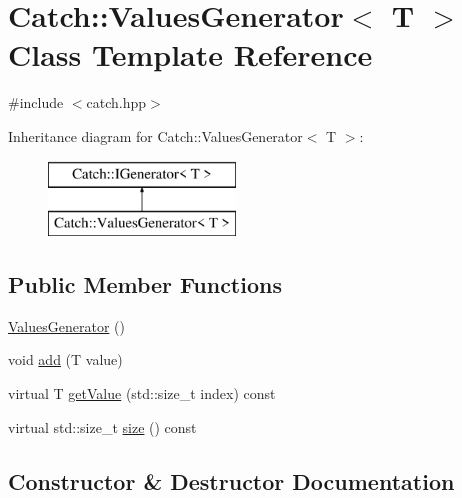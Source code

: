 \hypertarget{class_catch_1_1_values_generator}{}\section{Catch\+:\+:Values\+Generator$<$ T $>$ Class Template Reference}
\label{class_catch_1_1_values_generator}


{\ttfamily \#include $<$catch.\+hpp$>$}

Inheritance diagram for Catch\+:\+:Values\+Generator$<$ T $>$\+:\begin{figure}[H]
\begin{center}
\leavevmode
\includegraphics[height=2.000000cm]{class_catch_1_1_values_generator}
\end{center}
\end{figure}
\subsection*{Public Member Functions}
\begin{DoxyCompactItemize}
\item 
\mbox{\hyperlink{class_catch_1_1_values_generator_a36cd3d75afb1f5502400c3ad7cae7a5e}{Values\+Generator}} ()
\item 
void \mbox{\hyperlink{class_catch_1_1_values_generator_a8412c8ce5d9d4fc6ff06d5246d56d538}{add}} (T value)
\item 
virtual T \mbox{\hyperlink{class_catch_1_1_values_generator_a9674c8b70d562d2d68154de92dd1810a}{get\+Value}} (std\+::size\+\_\+t index) const
\item 
virtual std\+::size\+\_\+t \mbox{\hyperlink{class_catch_1_1_values_generator_a9aa5b140ee502975cf35115e534ab771}{size}} () const
\end{DoxyCompactItemize}


\subsection{Constructor \& Destructor Documentation}
\mbox{\label{class_catch_1_1_values_generator_a36cd3d75afb1f5502400c3ad7cae7a5e}} 
